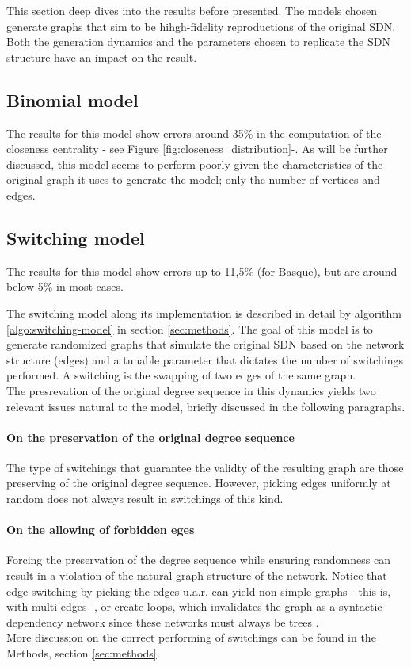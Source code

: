This section deep dives into the results before presented. The models chosen generate graphs that sim to be hihgh-fidelity reproductions of the original SDN. Both the generation dynamics and the parameters chosen to replicate the SDN structure have an impact on the result.

\subsection{Binomial model}
The results for this model show errors around 35\% in the computation of the closeness centrality - see Figure \ref{fig:closeness_distribution}-. As will be further discussed, this model seems to perform poorly given the characteristics of the original graph it uses to generate the model; only the number of vertices and edges.

\subsection{Switching model}
The results for this model show errors up to 11,5\% (for Basque), but are around below 5\% in most cases.

The switching model along its implementation is described in detail by algorithm \ref{algo:switching-model} in section \ref{sec:methods}. The goal of this model is to generate randomized graphs that simulate the original SDN based on the network structure (edges) and a tunable parameter that dictates the number of switchings performed. A switching is the swapping of two edges of the same graph.\\
The presrevation of the original degree sequence in this dynamics yields two relevant issues natural to the model, briefly discussed in the following paragraphs.

\paragraph{On the preservation of the original degree sequence} The type of switchings that guarantee the validty of the resulting graph are those preserving of the original degree sequence. However, picking edges uniformly at random does not always result in switchings of this kind. 

\paragraph{On the allowing of forbidden eges} Forcing the preservation of the degree sequence while ensuring randomness can result in a violation of the natural graph structure of the network. Notice that edge switching by picking the edges u.a.r. can yield non-simple graphs - this is, with multi-edges -, or create loops, which invalidates the graph as a syntactic dependency network since these networks must always be trees \cite{i2004patterns}.\\
More discussion on the correct performing of switchings can be found in the Methods, section \ref{sec:methods}.

